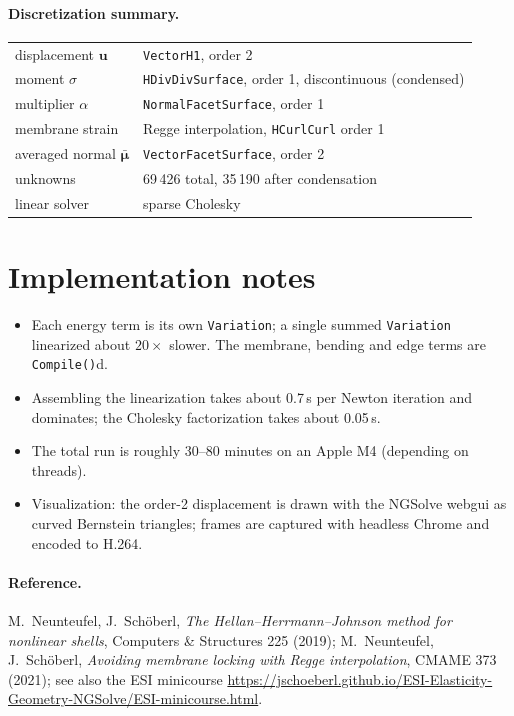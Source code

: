 \documentclass[11pt,a4paper]{article}
\newcommand{\bu}{\boldsymbol u}
\begin{document}
\paragraph{Discretization summary.}
\begin{center}
\begin{tabular}{ll}
\toprule
displacement $\bu$ & \texttt{VectorH1}, order 2 \\
moment $\sigma$ & \texttt{HDivDivSurface}, order 1, discontinuous (condensed) \\
multiplier $\alpha$ & \texttt{NormalFacetSurface}, order 1 \\
membrane strain & Regge interpolation, \texttt{HCurlCurl} order 1 \\
averaged normal $\bar{\boldsymbol\mu}$ & \texttt{VectorFacetSurface}, order 2 \\
unknowns & 69\,426 total, 35\,190 after condensation \\
linear solver & sparse Cholesky \\
\bottomrule
\end{tabular}
\end{center}

\section{Implementation notes}
\begin{itemize}
  \item Each energy term is its own \texttt{Variation}; a single summed \texttt{Variation}
        linearized about $20\times$ slower. The membrane, bending and edge terms are
        \texttt{Compile()}d.
  \item Assembling the linearization takes about 0.7\,s per Newton iteration and dominates;
        the Cholesky factorization takes about 0.05\,s.
  \item The total run is roughly 30--80 minutes on an Apple M4 (depending on threads).
  \item Visualization: the order-2 displacement is drawn with the NGSolve webgui as curved
        Bernstein triangles; frames are captured with headless Chrome and encoded to H.264.
\end{itemize}

\paragraph{Reference.}
M.~Neunteufel, J.~Sch\"oberl, \emph{The Hellan--Herrmann--Johnson method for nonlinear
shells}, Computers \& Structures 225 (2019); M.~Neunteufel, J.~Sch\"oberl, \emph{Avoiding
membrane locking with Regge interpolation}, CMAME 373 (2021); see also the ESI minicourse
\url{https://jschoeberl.github.io/ESI-Elasticity-Geometry-NGSolve/ESI-minicourse.html}.
\end{document}
